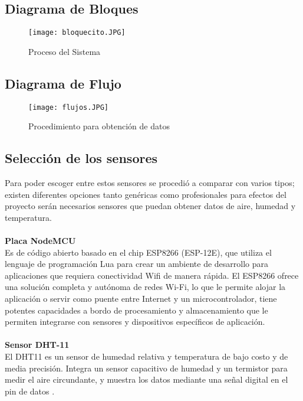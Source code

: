 \documentclass[10pt,a4paper]{article}
\begin{document}
\subsection{Diagrama de Bloques}

\begin{figure}[H]
\centering
 \texttt{[image: bloquecito.JPG]} 
\caption{Proceso del Sistema } 
\end{figure}

\subsection{Diagrama de Flujo}

\begin{figure}[H]
\centering
 \texttt{[image: flujos.JPG]} 
\caption{Procedimiento para obtención de datos } 
\end{figure}


\subsection{Selección de los sensores}

Para poder escoger entre estos sensores se procedió a comparar con varios tipos; existen diferentes opciones tanto genéricas como profesionales para efectos del proyecto serán necesarios sensores que puedan obtener datos de aire, humedad y temperatura.\\\\

\textbf{Placa NodeMCU}\\

Es de código abierto basado en el chip ESP8266 (ESP-12E), que utiliza el lenguaje de programación Lua para crear un ambiente de desarrollo para aplicaciones que requiera conectividad Wifi de manera rápida.
El ESP8266 ofrece una solución completa y autónoma de redes Wi-Fi, lo que le permite alojar la aplicación o servir como puente entre Internet y un microcontrolador, tiene potentes capacidades a bordo de procesamiento y almacenamiento que le permiten integrarse con sensores y dispositivos específicos de aplicación.\\\\

\textbf{Sensor DHT-11}\\

El DHT11 es un sensor de humedad relativa y temperatura de bajo costo y de media precisión. Integra un sensor capacitivo de humedad y un termistor para medir el aire circundante, y muestra los datos mediante una señal digital en el pin de datos . \\\\\\\\\\
\end{document}
